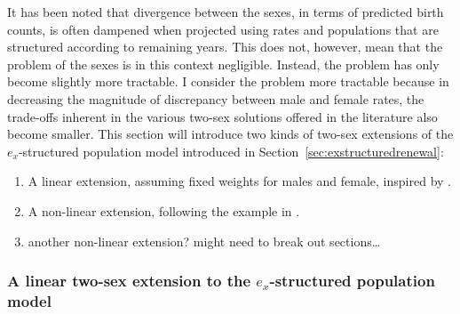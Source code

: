 \label{sec:exLotka2linear}
It has been noted that divergence between the sexes, in terms of predicted birth
counts, is often dampened when projected using rates and populations that are
structured according to remaining years. This does not, however, mean that the
problem of the sexes is in this context negligible. Instead, the problem has
only become slightly more tractable. I consider the problem more tractable
because in decreasing the magnitude of discrepancy between male and female
rates, the trade-offs inherent in the various two-sex solutions offered in the
literature also become smaller. This section will introduce two kinds of two-sex
extensions of the $e_x$-structured population model introduced in
Section~\ref{sec:exstructuredrenewal}:
\begin{enumerate}
  \item A linear extension, assuming fixed weights for males and female,
  inspired by \citet{goodman1967age}. 
  \item A non-linear extension, following the example in
  \citet{gupta1978alternative}.
  \item another non-linear extension? might need to break out sections\ldots
\end{enumerate}

\subsubsection{A linear two-sex extension to the $e_x$-structured population
model} 

